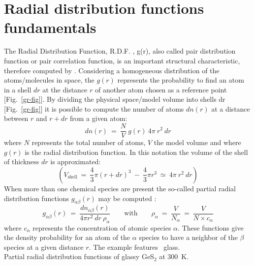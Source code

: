 \section{Radial distribution functions fundamentals}
\label{rdf}
The Radial Distribution Function, R.D.F. , g(r), also called pair distribution function or pair correlation function, is an important structural characteristic, therefore computed by \atomes.
\laf Considering a homogeneous distribution of the atoms/molecules in space, the $g(r)$ represents the probability to find an atom in a shell $dr$ at the distance $r$ of another atom chosen as a reference point [Fig.~\ref{gr-fig}].
By dividing the physical space/model volume into shells dr [Fig.~\ref{gr-fig}] it is possible to compute the number of atoms $dn(r)$ at a distance between $r$ and $r + dr$ from a given atom: 
\begin{equation}
\label{g2r_1}
dn(r)\ =\ \frac{N}{V}\ g(r)\ 4\pi\ r^{2}\ dr
\end{equation}
where $N$ represents the total number of atoms, $V$ the model volume and where $g(r)$ is the radial distribution function. 
In this notation the volume of the shell of thickness $dr$ is approximated: 
\begin{equation}
\left(V_{\text{shell}}\ =\ \displaystyle{\frac{4}{3}} \pi (r+dr)^3\ -\ \displaystyle{\frac{4}{3}} \pi r^3 \ \simeq\ 4\pi\ r^{2}\ dr \right)
\end{equation}
When more than one chemical species are present the so-called partial radial distribution functions $g_{\alpha\beta}(r)$ may be computed : 
\begin{equation}
\label{g2r_4}
g_{\alpha \beta}(r)\ =\ \frac{dn_{\alpha \beta}(r)}{4\pi r^{2}\ dr\ \rho_{\alpha}} \qquad \text{with} \qquad \rho_{\alpha}\ =\ \frac{V}{N_\alpha}\ =\ \frac{V}{N\times c_\alpha} 
\end{equation}
where $c_\alpha$ represents the concentration of atomic species $\alpha$.
\newpage
\noindent These functions give the density probability for an atom of the $\alpha$ species to have a neighbor of the $\beta$ species at a given distance $r$. The example features \ges\ glass. \\
 {Partial radial distribution functions of glassy GeS$_2$ at 300~K.}
